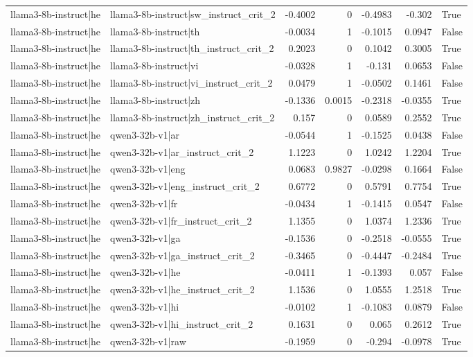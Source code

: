 \begin{table}
\begin{tabular}{l l r r r r l}
llama3-8b-instruct|he & llama3-8b-instruct|sw_instruct_crit_2 & -0.4002 & 0 & -0.4983 & -0.302 & True \\
llama3-8b-instruct|he & llama3-8b-instruct|th & -0.0034 & 1 & -0.1015 & 0.0947 & False \\
llama3-8b-instruct|he & llama3-8b-instruct|th_instruct_crit_2 & 0.2023 & 0 & 0.1042 & 0.3005 & True \\
llama3-8b-instruct|he & llama3-8b-instruct|vi & -0.0328 & 1 & -0.131 & 0.0653 & False \\
llama3-8b-instruct|he & llama3-8b-instruct|vi_instruct_crit_2 & 0.0479 & 1 & -0.0502 & 0.1461 & False \\
llama3-8b-instruct|he & llama3-8b-instruct|zh & -0.1336 & 0.0015 & -0.2318 & -0.0355 & True \\
llama3-8b-instruct|he & llama3-8b-instruct|zh_instruct_crit_2 & 0.157 & 0 & 0.0589 & 0.2552 & True \\
llama3-8b-instruct|he & qwen3-32b-v1|ar & -0.0544 & 1 & -0.1525 & 0.0438 & False \\
llama3-8b-instruct|he & qwen3-32b-v1|ar_instruct_crit_2 & 1.1223 & 0 & 1.0242 & 1.2204 & True \\
llama3-8b-instruct|he & qwen3-32b-v1|eng & 0.0683 & 0.9827 & -0.0298 & 0.1664 & False \\
llama3-8b-instruct|he & qwen3-32b-v1|eng_instruct_crit_2 & 0.6772 & 0 & 0.5791 & 0.7754 & True \\
llama3-8b-instruct|he & qwen3-32b-v1|fr & -0.0434 & 1 & -0.1415 & 0.0547 & False \\
llama3-8b-instruct|he & qwen3-32b-v1|fr_instruct_crit_2 & 1.1355 & 0 & 1.0374 & 1.2336 & True \\
llama3-8b-instruct|he & qwen3-32b-v1|ga & -0.1536 & 0 & -0.2518 & -0.0555 & True \\
llama3-8b-instruct|he & qwen3-32b-v1|ga_instruct_crit_2 & -0.3465 & 0 & -0.4447 & -0.2484 & True \\
llama3-8b-instruct|he & qwen3-32b-v1|he & -0.0411 & 1 & -0.1393 & 0.057 & False \\
llama3-8b-instruct|he & qwen3-32b-v1|he_instruct_crit_2 & 1.1536 & 0 & 1.0555 & 1.2518 & True \\
llama3-8b-instruct|he & qwen3-32b-v1|hi & -0.0102 & 1 & -0.1083 & 0.0879 & False \\
llama3-8b-instruct|he & qwen3-32b-v1|hi_instruct_crit_2 & 0.1631 & 0 & 0.065 & 0.2612 & True \\
llama3-8b-instruct|he & qwen3-32b-v1|raw & -0.1959 & 0 & -0.294 & -0.0978 & True \\

\end{tabular}
\end{table}
